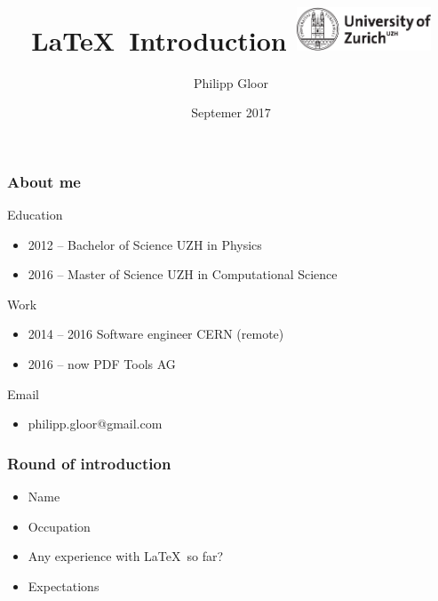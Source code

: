 \documentclass[10pt, a4paper]{beamer} %
\title{\LaTeX\ Introduction \hspace*{\fill}\includegraphics[width=4cm]{../../uzhpres/tex/uzh_logo_e_pos.pdf}}
\author{Philipp Gloor\inst{1}}
\institute[University of Zurich] %
{
  \inst{1}%
  philipp.gloor@gmail.com
  \\[\medskipamount]
      
}
\date{Septemer 2017} %
\begin{document}
    
    \begin{frame}
    \titlepage
    \end{frame}
\begin{frame}
\frametitle{About me}

\begin{block}{Education}
    \begin{itemize}
        \item 2012 -- Bachelor of Science UZH in Physics
        \item 2016 -- Master of Science UZH in Computational Science
    \end{itemize}
\end{block}

\begin{block}{Work}
    \begin{itemize}
        \item 2014 -- 2016 Software engineer CERN (remote)
        \item 2016 -- now PDF Tools AG
    \end{itemize}
\end{block}

\begin{block}{Email}
\begin{itemize}
    \item philipp.gloor@gmail.com
\end{itemize}
    
\end{block}
 
 
 
 
\end{frame}
\begin{frame}[t]\frametitle{Round of introduction}
    \begin{itemize}
        \item Name
        \item Occupation
        \item Any experience with \LaTeX\ so far?
        \item Expectations
    \end{itemize}
\end{frame}
\end{document}
